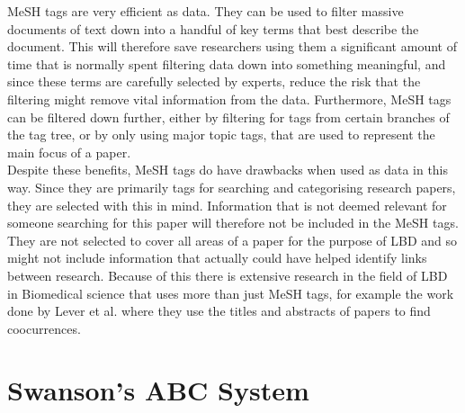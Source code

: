 \documentclass{l4proj}
\begin{document}
MeSH tags are very efficient as data. They can be used to filter massive documents of text down into a handful of key terms that best describe the document. This will therefore save researchers using them a significant amount of time that is normally spent filtering data down into something meaningful, and since these terms are carefully selected by experts, reduce the risk that the filtering might remove vital information from the data. Furthermore, MeSH tags can be filtered down further, either by filtering for tags from certain branches of the tag tree, or by only using major topic tags, that are used to represent the main focus of a paper. \\

Despite these benefits, MeSH tags do have drawbacks when used as data in this way. Since they are primarily tags for searching and categorising research papers, they are selected with this in mind. Information that is not deemed relevant for someone searching for this paper will therefore not be included in the MeSH tags. They are not selected to cover all areas of a paper for the purpose of LBD and so might not include information that actually could have helped identify links between research. Because of this there is extensive research in the field of LBD in Biomedical science that uses more than just MeSH tags, for example the work done by Lever et al. where they use the titles and abstracts of papers to find coocurrences. 

\section{Swanson's ABC System}
\end{document}
